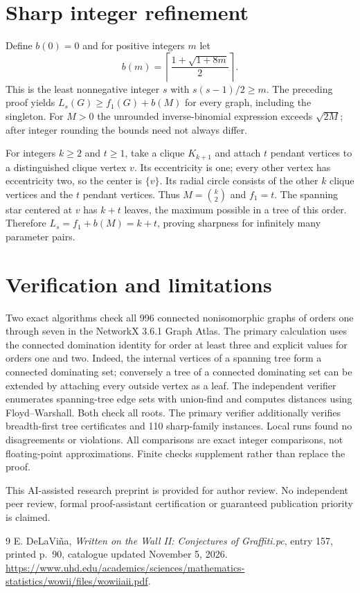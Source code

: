 \documentclass[11pt]{article}
\begin{document}
\section{Sharp integer refinement}
Define $b(0)=0$ and for positive integers $m$ let
\[
 b(m)=\left\lceil\frac{1+\sqrt{1+8m}}{2}\right\rceil.
\]
This is the least nonnegative integer $s$ with $s(s-1)/2\ge m$. The preceding proof yields $L_s(G)\ge f_1(G)+b(M)$ for every graph, including the singleton. For $M>0$ the unrounded inverse-binomial expression exceeds $\sqrt{2M}$; after integer rounding the bounds need not always differ.

For integers $k\ge2$ and $t\ge1$, take a clique $K_{k+1}$ and attach $t$ pendant vertices to a distinguished clique vertex $v$. Its eccentricity is one; every other vertex has eccentricity two, so the center is $\{v\}$. Its radial circle consists of the other $k$ clique vertices and the $t$ pendant vertices. Thus $M=\binom{k}{2}$ and $f_1=t$. The spanning star centered at $v$ has $k+t$ leaves, the maximum possible in a tree of this order. Therefore $L_s=f_1+b(M)=k+t$, proving sharpness for infinitely many parameter pairs.
\section{Verification and limitations}
Two exact algorithms check all 996 connected nonisomorphic graphs of orders one through seven in the NetworkX 3.6.1 Graph Atlas. The primary calculation uses the connected domination identity for order at least three and explicit values for orders one and two. Indeed, the internal vertices of a spanning tree form a connected dominating set; conversely a tree of a connected dominating set can be extended by attaching every outside vertex as a leaf. The independent verifier enumerates spanning-tree edge sets with union-find and computes distances using Floyd--Warshall. Both check all roots. The primary verifier additionally verifies breadth-first tree certificates and 110 sharp-family instances. Local runs found no disagreements or violations. All comparisons are exact integer comparisons, not floating-point approximations. Finite checks supplement rather than replace the proof.

This AI-assisted research preprint is provided for author review. No independent peer review, formal proof-assistant certification or guaranteed publication priority is claimed.
\begin{thebibliography}{9}
 E. DeLaVi\~na, \emph{Written on the Wall II: Conjectures of Graffiti.pc}, entry 157, printed p.~90, catalogue updated November 5, 2026. \url{https://www.uhd.edu/academics/sciences/mathematics-statistics/wowii/files/wowiiaii.pdf}.
\end{thebibliography}
\end{document}
